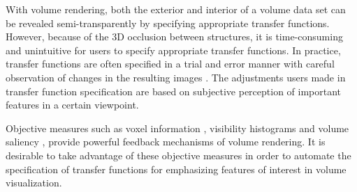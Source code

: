 With volume rendering, both the exterior and interior of a volume data set can be revealed semi-transparently by specifying appropriate transfer functions. However, because of the 3D occlusion between structures, it is time-consuming and unintuitive for users to specify appropriate transfer functions. In practice, transfer functions are often specified in a trial and error manner with careful observation of changes in the resulting images \cite{kniss_interactive_2001}.
The adjustments users made in transfer function specification are based on subjective perception of important features in a certain viewpoint.

Objective measures such as voxel information \cite{bordoloi_view_2005} \cite{wang_information_2011}, visibility histograms \cite{emsenhuber_visibility_2008} \cite{correa_visibility-driven_2009} and volume saliency \cite{kim_saliency-guided_2006}, provide powerful feedback mechanisms of volume rendering. It is desirable to take advantage of these objective measures in order to automate the specification of transfer functions for emphasizing features of interest in volume visualization.

% 
%
%
 



